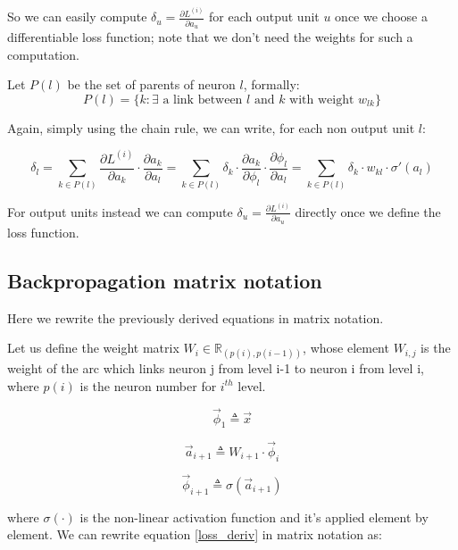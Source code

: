 \documentclass{article}
\begin{document}
So we can easily compute $\delta_u = \frac{\partial L^{(i)}}{\partial a_u} $ for each output unit $u$ once we choose a differentiable loss function; note
that we don't need the weights for such a computation. 

Let $P(l)$ be the set of parents of neuron $l$, formally:
\begin{equation} 
P(l) = \{ k: \exists \text{ a link between $l$ and $k$ with weight } w_{lk} \}
\end{equation}

Again, simply using the chain rule, we can write, for each non output unit $l$:

\begin{equation}
\label{loss_deriv}
\delta_l = \sum_{k\in P(l)} \frac{\partial L^{(i)}}{\partial a_k} \cdot \frac{\partial a_k}{\partial a_l}= \sum_{k\in P(l)} \delta_k \cdot 
\frac{\partial a_k}{\partial \phi_l} \cdot \frac{\partial \phi_l}{\partial a_l} = \sum_{k\in P(l)} \delta_k \cdot 
w_{kl} \cdot \sigma'(a_l)
\end{equation}


For output units instead we can compute $\delta_u = \frac{\partial L^{(i)}}{\partial a_u} $ directly once we define the loss function.

\subsection{Backpropagation matrix notation}

Here we rewrite the previously derived equations in matrix notation.

Let us define the weight matrix $W_i \in \mathbb{R}_{(p(i),p(i-1))}$, whose element $W_{i,j}$ is the weight of the arc which links neuron j from level i-1 to neuron i from level i, where
$p(i)$ is the neuron number for $i^{th}$ level.

\begin{equation}
 \overrightarrow{\phi}_1 \triangleq \overrightarrow{x}
\end{equation}

\begin{equation}
 \overrightarrow{a}_{i+1} \triangleq W_{i+1} \cdot \overrightarrow{\phi}_i
\end{equation}

\begin{equation}
 \overrightarrow{\phi}_{i+1} \triangleq \sigma(\overrightarrow{a}_{i+1})
\end{equation}

where $\sigma(\cdot)$ is the non-linear activation function and it's applied element by element.
We can rewrite equation \ref{loss_deriv} in matrix notation as:
\end{document}
